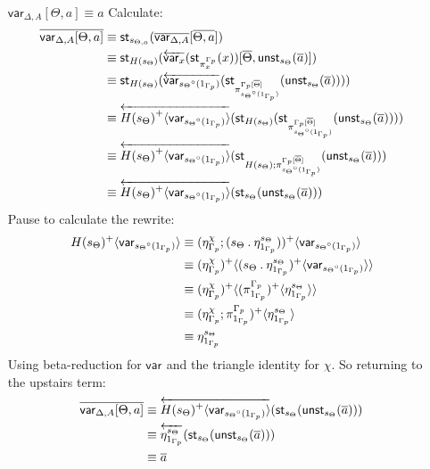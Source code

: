 \documentclass[10pt]{article}
\theoremstyle{definition}
\newcommand{\rewrite}[2]{\overleftarrow{#1}(#2)}
\newcommand\StI[2]{\ensuremath{\mathsf{st}_{#1}(#2)}}
\newcommand\UnSt[2]{\ensuremath{\mathsf{unst}_{#1}(#2)}}
\newcommand\TrCirc[2]{\ensuremath{{#1}^\circ(#2)}}
\newcommand\var[1]{\ensuremath{\mathsf{var}_{#1}}}
\newcommand\ap[2]{\ensuremath{#1 \langle #2 \rangle }}
\newcommand\ApPlus[2]{\ensuremath{{#1}^+ \langle #2 \rangle }}
\newcommand\bdot[0]{\mathbin{.}}
\begin{document}
\begin{enumerate}[style = multiline, labelwidth = 80pt]
\item[{$\var{\Delta,A}[\Theta, a] \equiv a$}] Calculate:
\begin{align*}
\upstairs{\var{\Delta,A}[\Theta, a]}
&\equiv \StI{s_{\Theta, a}}{\upstairs{\var{\Delta, A}}[\upstairs{\Theta, a}]} \\
&\equiv \StI{H(s_\Theta)}{\rewrite{\var{x}}{\StI{\pi^{\asdep{\Gamma}}_x}{x}}[\upstairs{\Theta}, \UnSt{s_\Theta}{\upstairs{a}}]} \\
&\equiv \StI{H(s_\Theta)}{\rewrite{\var{\TrCirc{s_\Theta}{1_{\asdep{\Gamma}}}}}{\StI{\pi^{\asdep{\Gamma}[\upstairs{\Theta}]}_{\TrCirc{s_\Theta}{1_{\asdep{\Gamma}}}}}{\UnSt{s_\Theta}{\upstairs{a}}}}} \\
&\equiv \rewrite{\ApPlus{H(s_\Theta)}{\var{\TrCirc{s_\Theta}{1_{\asdep{\Gamma}}}}}}{\StI{H(s_\Theta)}{\StI{\pi^{\asdep{\Gamma}[\upstairs{\Theta}]}_{\TrCirc{s_\Theta}{1_{\asdep{\Gamma}}}}}{\UnSt{s_\Theta}{\upstairs{a}}}}} \\
&\equiv \rewrite{\ApPlus{H(s_\Theta)}{\var{\TrCirc{s_\Theta}{1_{\asdep{\Gamma}}}}}}{\StI{H(s_\Theta);\pi^{\asdep{\Gamma}[\upstairs{\Theta}]}_{\TrCirc{s_\Theta}{1_{\asdep{\Gamma}}}}}{\UnSt{s_\Theta}{\upstairs{a}}}} \\
&\equiv \rewrite{\ap{H(s_\Theta)^+}{\var{\TrCirc{s_\Theta}{1_{\asdep{\Gamma}}}}}}{\StI{s_\Theta}{\UnSt{s_\Theta}{\upstairs{a}}}}
\end{align*}
Pause to calculate the rewrite:
\begin{align*}
\ap{H(s_\Theta)^+}{\var{\TrCirc{s_\Theta}{1_{\asdep{\Gamma}}}}}
&\equiv \ap{(\eta^\chi_{\asdep{\Gamma}}; (s_\Theta \bdot \eta_{1_{\asdep{\Gamma}}}^{s_\Theta}))^+}{\var{\TrCirc{s_\Theta}{1_{\asdep{\Gamma}}}}} \\
&\equiv \ap{(\eta^\chi_{\asdep{\Gamma}})^+}{\ap{(s_\Theta \bdot \eta_{1_{\asdep{\Gamma}}}^{s_\Theta})^+}{\var{\TrCirc{s_\Theta}{1_{\asdep{\Gamma}}}}}} \\
&\equiv \ap{(\eta^\chi_{\asdep{\Gamma}})^+}{\ap{(\pi^{\asdep{\Gamma}}_{1_{\asdep{\Gamma}}})^+}{\eta_{1_{\asdep{\Gamma}}}^{s_\Theta}}} \\
&\equiv \ap{(\eta^\chi_{\asdep{\Gamma}};\pi^{\asdep{\Gamma}}_{1_{\asdep{\Gamma}}})^+}{\eta_{1_{\asdep{\Gamma}}}^{s_\Theta}} \\
&\equiv \eta_{1_{\asdep{\Gamma}}}^{s_\Theta}
\end{align*}
Using beta-reduction for $\var{}$ and the triangle identity for $\chi$. So returning to the upstairs term:
\begin{align*}
\upstairs{\var{\Delta,A}[\Theta, a]}
&\equiv \rewrite{\ap{H(s_\Theta)^+}{\var{\TrCirc{s_\Theta}{1_{\asdep{\Gamma}}}}}}{\StI{s_\Theta}{\UnSt{s_\Theta}{\upstairs{a}}}} \\
&\equiv \rewrite{\eta_{1_{\asdep{\Gamma}}}^{s_\Theta}}{\StI{s_\Theta}{\UnSt{s_\Theta}{\upstairs{a}}}} \\
&\equiv \upstairs{a}
\end{align*}


\end{enumerate}
\end{document}
